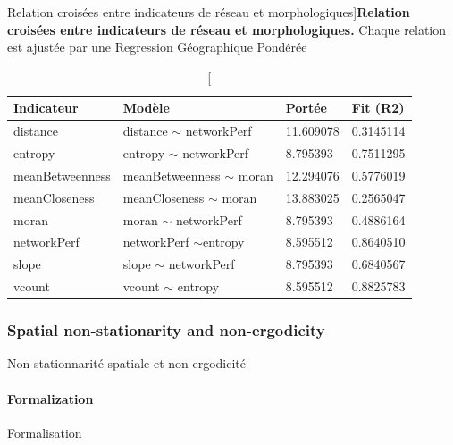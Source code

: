 \begin{table}
\caption[][Relation croisées entre indicateurs de réseau et morphologiques]{}{\textbf{Relation croisées entre indicateurs de réseau et morphologiques.} Chaque relation est ajustée par une Regression Géographique Pondérée\label{tab:staticcorrelations:gwr}}
\begin{tabular}{|l|l|l|l|}
\hline
Indicateur & Modèle & Portée & Fit (R2) \\ \hline
distance & distance $\sim$ networkPerf & 11.609078 & 0.3145114 \\
entropy  & entropy $\sim$ networkPerf &  8.795393  &0.7511295 \\
meanBetweenness & meanBetweenness $\sim$ moran & 12.294076 & 0.5776019 \\
meanCloseness &  meanCloseness $\sim$ moran & 13.883025 & 0.2565047 \\
moran & moran $\sim$ networkPerf &  8.795393 & 0.4886164 \\
networkPerf & networkPerf $\sim$entropy & 8.595512  & 0.8640510 \\
slope & slope $\sim$ networkPerf & 8.795393  & 0.6840567 \\
vcount & vcount $\sim$ entropy & 8.595512  & 0.8825783 \\\hline
\end{tabular}
\end{table}



\subsubsection{Spatial non-stationarity and non-ergodicity}{Non-stationnarité spatiale et non-ergodicité}


\paragraph{Formalization}{Formalisation}


